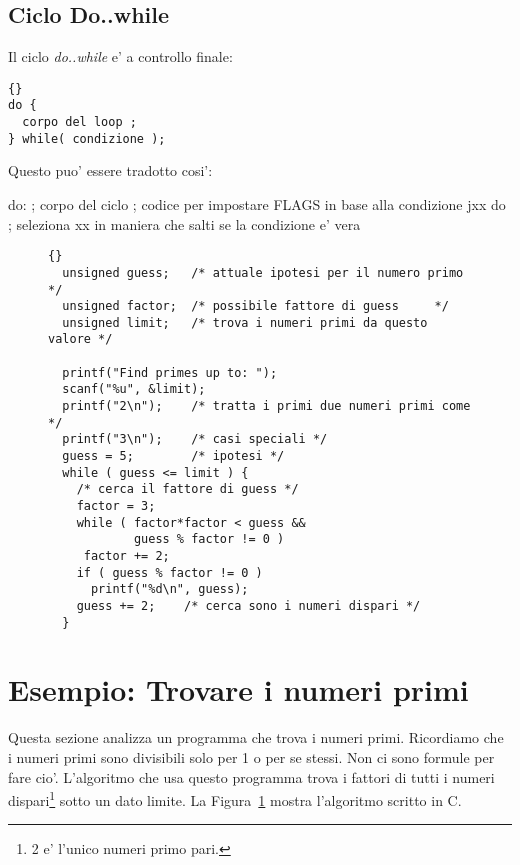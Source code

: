 \subsection{Ciclo Do..while }
Il ciclo \emph{do..while} e' a controllo finale:
\begin{lstlisting}[stepnumber=0]{}
do {
  corpo del loop ;
} while( condizione );
\end{lstlisting}
\noindent Questo puo' essere tradotto cosi':
\begin{AsmCodeListing}[frame=none]
do:
      ; corpo del ciclo
      ; codice per impostare FLAGS in base alla condizione
      jxx    do      ; seleziona xx in maniera che salti se la condizione e' vera
\end{AsmCodeListing}


\begin{figure}[t]
\begin{lstlisting}[frame=tlrb]{}
  unsigned guess;   /* attuale ipotesi per il numero primo */
  unsigned factor;  /* possibile fattore di guess     */
  unsigned limit;   /* trova i numeri primi da questo valore */

  printf("Find primes up to: ");
  scanf("%u", &limit);
  printf("2\n");    /* tratta i primi due numeri primi come */
  printf("3\n");    /* casi speciali */
  guess = 5;        /* ipotesi */
  while ( guess <= limit ) {
    /* cerca il fattore di guess */
    factor = 3;
    while ( factor*factor < guess &&
            guess % factor != 0 )
     factor += 2;
    if ( guess % factor != 0 )
      printf("%d\n", guess);
    guess += 2;    /* cerca sono i numeri dispari */
  }
\end{lstlisting}
\caption{}\label{fig:primec}
\end{figure}

\section{Esempio: Trovare i numeri primi}
Questa sezione analizza un programma che trova i numeri primi. Ricordiamo
che i numeri primi sono divisibili solo per 1 o per se stessi. Non ci
sono formule per fare cio'. L'algoritmo che usa questo programma trova
i fattori di tutti i numeri dispari\footnote{2 e' l'unico numeri primo
pari.} sotto un dato limite. La Figura~\ref{fig:primec} mostra l'algoritmo
 scritto in C.

